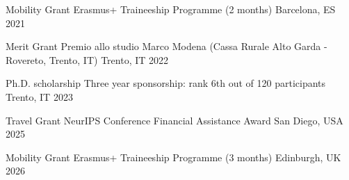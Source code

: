 \documentclass[11pt, a4paper]{awesome-cv}
\begin{document}

\begin{cvhonors}
  \cvhonor
    {Mobility Grant} %
    {Erasmus+ Traineeship Programme (2 months)} %
    {Barcelona, ES} %
    {2021} %


  \cvhonor
    {Merit Grant} %
    {Premio allo studio Marco Modena (Cassa Rurale Alto Garda - Rovereto, Trento, IT)} %
    {Trento, IT} %
    {2022} %


\cvhonor
    {Ph.D. scholarship} %
    {Three year sponsorship: rank 6th out of 120 participants} %
    {Trento, IT} %
    {2023} %

  \cvhonor
    {Travel Grant} %
    {NeurIPS Conference Financial Assistance Award} %
    {San Diego, USA} %
    {2025} %

  \cvhonor
    {Mobility Grant} %
    {Erasmus+ Traineeship Programme (3 months)} %
    {Edinburgh, UK} %
    {2026} %


\end{cvhonors}


\end{document}
